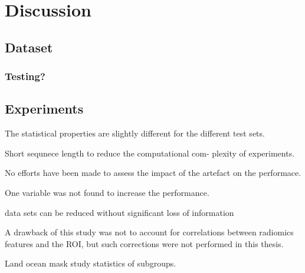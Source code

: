 \chapter{Discussion}

\section{Dataset}
\subsection{Testing?}

\section{Experiments}



The statistical properties are slightly different for the different test sets.  

Short sequnece length to reduce the computational com-
plexity of experiments. 

No efforts have been made to assess the impact of the artefact on the performace.

One variable was not found to increase the performance.


data sets can be reduced without significant loss of information

A drawback of this study was not to account for correlations between radiomics features and the ROI, but such corrections were
not performed in this thesis.

Land ocean mask study statistics of subgroups.